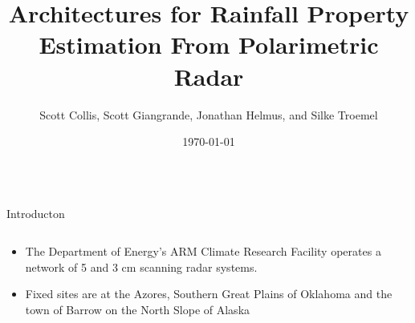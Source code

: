 \documentclass[final]{beamer}
\title{\huge Architectures for Rainfall Property Estimation From Polarimetric Radar}
\author[Collis et al.]{Scott Collis, Scott Giangrande, Jonathan Helmus, and Silke Troemel}
\institute[Argonne]{Argonne National Laboratory Argonne, ILUnited States }
\date{\today}
\begin{document}
\begin{frame}{} 
 \begin{columns}[t]
    \begin{column}{.3\linewidth}
  \vfill
 
      \begin{block}{Introducton}
        \begin{columns}[t]
          \begin{column}{.5\linewidth}
        \begin{itemize}
        \item The Department of Energy's ARM Climate Research Facility operates a network of 5 and 3 cm scanning radar systems.
        \item Fixed sites are at the Azores, Southern Great Plains of Oklahoma and the town of Barrow on the North Slope of Alaska                                %
         \end{itemize}
         \end{column}
         \end{columns}
         \end{block}
       

     

    \end{column}
      \begin{column}{.3\linewidth}
  \vfill
 

\end{column}
\end{columns}
\end{frame}
\end{document}

